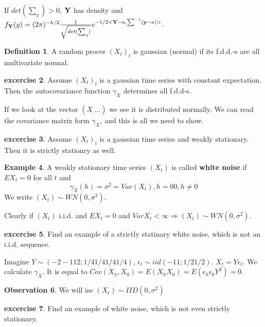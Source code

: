 \documentclass[12pt,a4paper]{amsart}
\theoremstyle{definition} %
\newtheorem{defn}{Definition}[section]
\newtheorem{example}[defn]{Example}
\newtheorem{excercise}[defn]{excercise}
\newtheorem{observation}[defn]{Observation}
\theoremstyle{plain} %
\begin{document}
If $det (\sum_y) > 0$, ${\bf Y}$ has density and $f_{\bf Y}(y) = (2 \pi)^{-k/2}\frac{1}{\sqrt{det(\sum_y)}} e^{-1/2<{\bf Y} - a, \sum^{-1}({\bf y} - a)>}$.

\begin{defn}
A random proces $(X_t)_t$ is gaussian (normal) if its f.d.d.-s are all multivariate normal.
\end{defn} 


\begin{excercise}
Assume $(X_t)_t$ is a gaussian time series with constant expectation. Then the autocovariance function $\gamma_X$ determines all f.d.d-s.

If we look at the vector $(X_, \dots)$ we see it is distributed normally. We can read the covariance matrix form $\gamma_X$, and this is all we need to show.
\end{excercise}

\begin{excercise}
Assume $(X_t)_t$ is a gaussian time series and weakly stationary. Then it is strictly stationry as well. 
\end{excercise}


\begin{example}
A weakly stationary time series $(X_t)$ is called {\bf white noise } if $EX_t = 0$ for all $t$ and 
$$\gamma_X(h) =  \sigma^2 = Var(X_t) ,h = 0
			0, h \neq 0
$$
We write $(X_t) \sim WN(0, \sigma^2)$.

Clearly if $(X_t)$ i.i.d. and $EX_t = 0$ and $Var X_t < \infty \Rightarrow (X_t) \sim WN(0, \sigma^2)$.  
\end{example}


\begin{excercise}
Find an example of a strictly statinary white noise, which is not an i.i.d. sequence.

Imagine $Y \sim (-2 -1 1 2; 1/4 1/4 1/4 1/4)$, $\epsilon_t \sim iid (-1 1; 1/2 1/2)$. $X_t = Y \epsilon_t$. We calculate $\gamma_X$. It is equal to $Cov(X_h, X_0) = E(X_h X_0) = E(\epsilon_h \epsilon_0 Y^2) = 0$.
\end{excercise}

\begin{observation}
We will ise $(X_t) \sim IID(0, \sigma^2)$
\end{observation}

\begin{excercise}
Find an example of white noise, which is not even strictly stationary.
\end{excercise}
\end{document}
